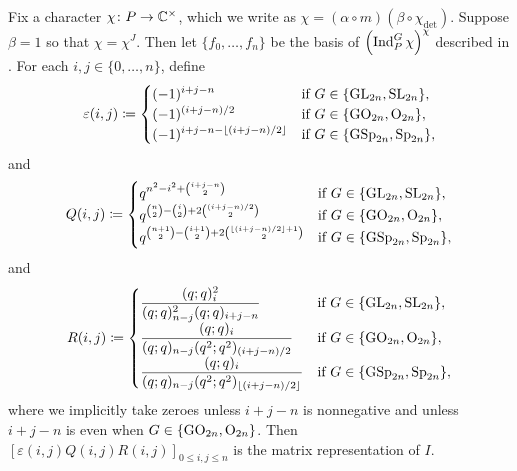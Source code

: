 \begin{proposition} \label{prop:trivial-matrix-coeffs}
	Fix a character $\chi\colon P\to\mathbb C^\times$, which we write as $\chi=(\alpha\circ m)(\beta\circ\chi_{\det})$. Suppose $\beta=1$ so that $\chi=\chi^J$. Then let $\{f_0,\ldots,f_n\}$ be the basis of $\left(\operatorname{Ind}_P^G\chi\right)^\chi$ described in . For each $i,j\in\{0,\ldots,n\}$, define
    \[\varepsilon(i,j)\coloneqq\begin{cases}
        \displaystyle(-1)^{i+j-n} & \text{if }G\in\{\mathrm{GL}_{2n},\mathrm{SL}_{2n}\}, \\
		\displaystyle(-1)^{(i+j-n)/2} & \text{if }G\in\{\mathrm{GO}_{2n},\mathrm{O}_{2n}\}, \\
		\displaystyle(-1)^{i+j-n-\left\lfloor{(i+j-n)/2}\right\rfloor} & \text{if }G\in\{\mathrm{GSp}_{2n},\mathrm{Sp}_{2n}\}, \\
    \end{cases}\]
    and
    \[Q(i,j)\coloneqq\begin{cases}
        q^{n^2-i^2+\binom{i+j-n}2} & \text{if }G\in\{\mathrm{GL}_{2n},\mathrm{SL}_{2n}\}, \\
		q^{\binom{n}2-\binom{i}2+2\binom{(i+j-n)/2}2} & \text{if }G\in\{\mathrm{GO}_{2n},\mathrm{O}_{2n}\}, \\
		q^{\binom{n+1}2-\binom{i+1}2+2\binom{\left\lfloor{(i+j-n)/2}\right\rfloor+1}2} & \text{if }G\in\{\mathrm{GSp}_{2n},\mathrm{Sp}_{2n}\}, \\
    \end{cases}\]
    and
    \[R(i,j)\coloneqq\begin{cases}
        \displaystyle\frac{(q;q)_i^2}{(q;q)_{n-j}^2(q;q)_{i+j-n}} & \text{if }G\in\{\mathrm{GL}_{2n},\mathrm{SL}_{2n}\}, \\
		\displaystyle\frac{(q;q)_i}{(q;q)_{n-j}(q^2;q^2)_{(i+j-n)/2}} & \text{if }G\in\{\mathrm{GO}_{2n},\mathrm{O}_{2n}\}, \\
		\displaystyle\frac{(q;q)_i}{(q;q)_{n-j}(q^2;q^2)_{\left\lfloor{(i+j-n)/2}\right\rfloor}}& \text{if }G\in\{\mathrm{GSp}_{2n},\mathrm{Sp}_{2n}\},
    \end{cases}\]
	where we implicitly take zeroes unless $i+j-n$ is nonnegative and unless $i+j-n$ is even when $G\in\{\mathrm{GO}_{2n},\mathrm{O}_{2n}\}$. Then $[\varepsilon
    (i,j)Q(i,j)R(i,j)]_{0\le i,j\le n}$ is the matrix representation of $I$.
\end{proposition}
